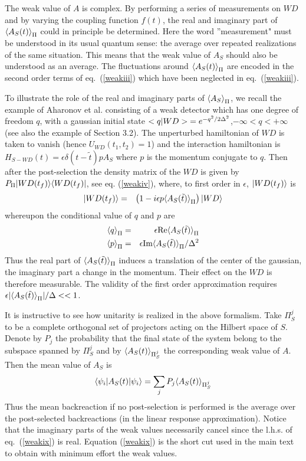 \documentclass[12pt]{article}
\begin{document}
The weak value of $A$ is complex. By  performing a
series of
measurements on $WD$
and by varying the coupling function $f(t)$, the real and imaginary part of
$\mbox{$ \langle A_{S}(t) \rangle $}_{\Pi}$
 could in principle be determined. Here the word ''measurement"
must be understood in its usual quantum sense: the average over repeated
realizations of the same situation. This means that the weak value of $A_S$
should also be understood as an average. The fluctuations around
$\mbox{$ \langle A_{S}(t) \rangle $}_{\Pi}$
are encoded in the second order terms of eq.~(\ref{weakiii}) which have been
neglected in eq.~(\ref{weakiii}).

To illustrate the role of the real and imaginary parts of $\mbox{$ \langle A_{S} \rangle $}_{\Pi}$,
we
recall the example of Aharonov et al. consisting of a  weak
detector which has one degree of freedom $q$,
 with a gaussian initial state
$\mbox{$ < q \vert WD > $}=e^{-q^2/
2\Delta^2}$,$-\infty < q < + \infty$ (see also the example of Section 3.2).
 The unperturbed hamiltonian of $WD$ is taken to vanish
(hence $U_{WD}(t_1,t_2) = 1$)
 and the interaction hamiltonian is  $H_{S-WD} (t) =\epsilon
\delta(t-\tilde t) p A_S$ where $p$ is the momentum conjugate to $q$. Then
after the post-selection the density matrix
of the $WD$ is given by $P_{\Pi} \mbox{$ \vert WD(t_f) \rangle $}\mbox{$ \langle WD(t_f) \vert $}$,
see eq. (\ref{weakiv}),
  where, to
first order in $\epsilon$, $\mbox{$ \vert WD(t_f) \rangle $}$ is
\begin{eqnarray}
\mbox{$ \vert WD(t_f) \rangle $} &=&\left(1-i\epsilon p\mbox{$ \langle A_{S}(\tilde t) \rangle $}_{\Pi} \right)
\mbox{$ \vert WD \rangle $}
 \end{eqnarray}
whereupon the conditional value of $q$ and $p$ are
\begin{eqnarray}
\mbox{$ \langle q \rangle $}_{\Pi}&=& \epsilon \mbox{Re} \mbox{$ \langle A_{S}(\tilde t) \rangle $}_{\Pi}\nonumber\\
\mbox{$ \langle p \rangle $}_{\Pi}&=& \epsilon \mbox{Im} \mbox{$ \langle A_{S}(\tilde t) \rangle $}_{\Pi}/\Delta^2
 \label{weakviii}
 \end{eqnarray}
 Thus the real part of $\mbox{$ \langle A_{S}(\tilde t) \rangle $}_{\Pi} $ induces a
translation of the center of the gaussian, the imaginary part
a change in the
momentum. Their effect on the $WD$ is therefore measurable.
The validity of the first order approximation requires
$\mbox{$ \epsilon $} |\mbox{$ \langle A_{S}(\tilde t) \rangle $}_{\Pi} | / \Delta <<1$.

It is instructive to see how unitarity is realized in the above formalism.
Take
 $\Pi^j_S$
to be  a
complete orthogonal set of projectors acting on the
Hilbert space of $S$. Denote by $P_j$ the probability that
the final state of the system belong to the subspace spanned by $\Pi^j_S$ and
by $\mbox{$ \langle A_{S}(t) \rangle $}_{\Pi^j_S} $ the corresponding weak
value of $A$. Then the mean value of
$A_S$ is  \begin{equation} \mbox{$ \mbox{$ \langle \psi_i \vert $} $} A_S(t) \mbox{$ \mbox{$ \vert \psi_i \rangle $} $} =
\sum_j P_j \mbox{$ \langle A_{S}(t) \rangle $}_{\Pi^j_S}
  \label{weakix}
\end{equation}
Thus the mean
backreaction if no post-selection is performed is the average over the
post-selected backreactions (in the linear response approximation).
Notice that the imaginary parts of the weak
values necessarily cancel since the l.h.s. of eq.~(\ref{weakix}) is
real. Equation (\ref{weakix}) is the short cut used in the main text to
obtain with minimum effort the weak values.
\end{document}
